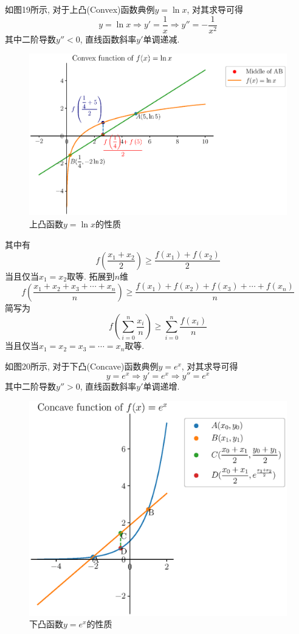 \documentclass{book}
\begin{document}
    如图19所示, 对于上凸(Convex)函数典例$y=\ln x$, 对其求导可得$$y=\ln x\Longrightarrow y'=\frac{1}{x}\Longrightarrow y''=-\frac{1}{x^2}$$其中二阶导数$y''<0$, 直线函数斜率$y'$单调递减.

    \begin{figure}[htbp]
        \centering
        \includegraphics[width=\textwidth]{img/ConvexFunctionIntro.eps}
        \caption{上凸函数$\displaystyle y=\ln x$的性质}
    \end{figure}

    其中有$$f\left( \frac{x_1+x_2}{2} \right)\ge \frac{f\left( x_1 \right)+f\left( x_2 \right)}{2}$$当且仅当$x_1=x_2$取等. 拓展到$n$维$$f\left( \frac{x_1+x_2+x_3+\cdots+x_n}{n} \right)\ge \frac{f(x_1)+f(x_2)+f(x_3)+\cdots+f(x_n)}{n}$$简写为$$f\left( \sum_{i=0}^{n}\frac{x_i }{n} \right)\ge \sum_{i=0}^{n}\frac{f(x_i) }{n}$$当且仅当$x_1=x_2=x_3=\cdots=x_n$取等.

    如图20所示, 对于下凸(Concave)函数典例$y=e^x$, 对其求导可得$$y=e^x\Longrightarrow y'=e^x\Longrightarrow y''=e^x$$其中二阶导数$y''>0$, 直线函数斜率$y'$单调递增.

    \begin{figure}[htbp] 
        \centering
        \includegraphics[width=\textwidth]{img/ConcaveFunctionIntro.eps}
        \caption{下凸函数$\displaystyle y=e^x$的性质}
    \end{figure}
\end{document}
